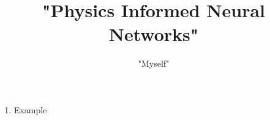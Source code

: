 \documentclass{article}
\begin{document}
\author{"Myself"}
\title{"Physics Informed Neural Networks"}
\maketitle 



\begin{enumerate}
	\item Example ~\cite{Example}

\end{enumerate}




{}

\end{document}
